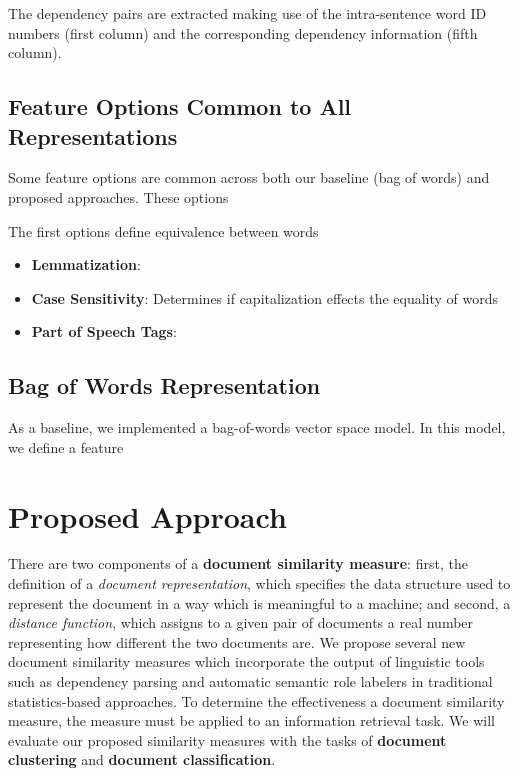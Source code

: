 \documentclass[11pt]{article}
\newcommand{\bt}[1]{\textbf{#1}}
\begin{document}
The dependency pairs are extracted making use of the intra-sentence word ID numbers (first column) and the corresponding dependency information (fifth column).




\subsection{Feature Options Common to All Representations}

Some feature options are common across both our baseline (bag of words) and proposed approaches. These options 

The first options define equivalence between words

\begin{itemize}
 \item \textbf{Lemmatization}: 
 \item \textbf{Case Sensitivity}: Determines if capitalization effects the equality of words
 \item \textbf{Part of Speech Tags}: 
 
 
 \end{itemize}

\subsection{Bag of Words Representation}

As a baseline, we implemented a bag-of-words vector space model. In this model, we define a feature 

\section{Proposed Approach}

There are two components of a \bt{document similarity measure}: first, the definition of a \emph{document representation}, which specifies the data structure used to represent the document in a way which is meaningful to a machine; and second, a \emph{distance function}, which assigns to a given pair of documents a real number representing how different the two documents are. We propose several new document similarity measures which incorporate the output of linguistic tools such as dependency parsing and automatic semantic role labelers  in traditional statistics-based approaches. To determine the effectiveness a document similarity measure, the measure must be applied to an information retrieval task. We will evaluate our proposed similarity measures with the tasks of \bt{document clustering} and \bt{document classification}. 
\end{document}
